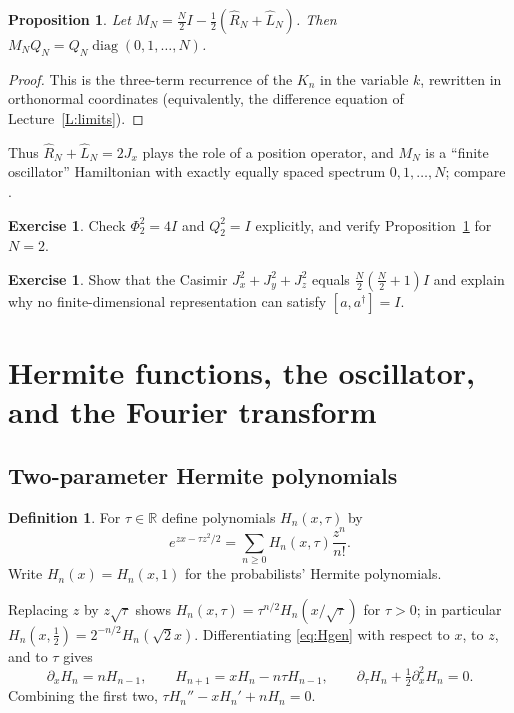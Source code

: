 \documentclass[11pt,reqno]{amsart}
\newtheorem{proposition}[theorem]{Proposition}
\theoremstyle{definition}
\newtheorem{definition}[theorem]{Definition}
\newtheorem{exercise}[theorem]{Exercise}
\theoremstyle{remark}
\newcommand{\R}{\mathbb R}
\newcommand{\Id}{I}
\DeclareMathOperator{\diag}{diag}
\begin{document}
\begin{proposition}\label{prop:Qdiag}
Let $M_N=\frac N2\Id-\frac12(\widehat R_N+\widehat L_N)$. Then
$M_NQ_N=Q_N\diag(0,1,\dots,N)$.
\end{proposition}
\begin{proof}
This is the three-term recurrence of the $K_n$ in the variable $k$,
rewritten in orthonormal coordinates (equivalently, the difference
equation of Lecture~\ref{L:limits}).
\end{proof}
Thus $\widehat R_N+\widehat L_N=2J_x$ plays the role of a position
operator, and $M_N$ is a ``finite oscillator'' Hamiltonian with exactly
equally spaced spectrum $0,1,\dots,N$; compare
\cite{AtakishievSuslov1990,AtakishievWolf1997}.

\begin{exercise}
Check $\Phi_2^2=4\Id$ and $Q_2^2=\Id$ explicitly, and verify
Proposition~\ref{prop:Qdiag} for $N=2$.
\end{exercise}
\begin{exercise}
Show that the Casimir $J_x^2+J_y^2+J_z^2$ equals
$\frac N2(\frac N2+1)\Id$ and explain why no finite-dimensional
representation can satisfy $[a,a^\dagger]=\Id$.
\end{exercise}

\section{Hermite functions, the oscillator, and the Fourier transform}\label{L:hermite}

\subsection{Two-parameter Hermite polynomials}
\begin{definition}
For $\tau\in\R$ define polynomials $H_n(x,\tau)$ by
\begin{equation}\label{eq:Hgen}
e^{zx-\tau z^2/2}=\sum_{n\ge0}H_n(x,\tau)\frac{z^n}{n!}.
\end{equation}
Write $H_n(x)=H_n(x,1)$ for the probabilists' Hermite polynomials.
\end{definition}
Replacing $z$ by $z\sqrt\tau$ shows $H_n(x,\tau)=\tau^{n/2}H_n(x/\sqrt\tau)$
for $\tau>0$; in particular $H_n(x,\tfrac12)=2^{-n/2}H_n(\sqrt2x)$.
Differentiating \eqref{eq:Hgen} with respect to $x$, to $z$, and to
$\tau$ gives
\begin{equation}\label{eq:Hrec}
\partial_xH_n=nH_{n-1},\qquad
H_{n+1}=xH_n-n\tau H_{n-1},\qquad
\partial_\tau H_n+\tfrac12\partial_x^2H_n=0.
\end{equation}
Combining the first two, $\tau H_n''-xH_n'+nH_n=0$.
\end{document}
